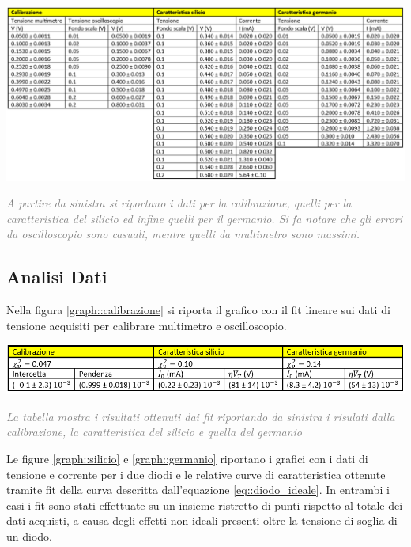 \documentclass[a4paper,11pt]{article}
\begin{document}
\begin{table}[h!]
    \centering
 \includegraphics[width=1. \textwidth]{pictures/tabella.png}
    
    \caption{\textit{\textcolor{gray}{A partire da sinistra si riportano i dati per la calibrazione, quelli per la caratteristica del silicio ed infine quelli per il germanio. Si fa notare che gli errori da oscilloscopio sono casuali, mentre quelli da multimetro sono massimi.}}}
        \label{tab::dati}
\end{table}


\subsection{Analisi Dati} 

Nella figura \ref{graph::calibrazione} si riporta il grafico con il fit lineare sui dati di tensione acquisiti per calibrare multimetro e oscilloscopio. 

\begin{table}[h!]
	\centering
  \includegraphics[width=1.\textwidth]{pictures/risultati2.png}	\caption{\textit{\textcolor{gray}{La tabella mostra i risultati ottenuti dai fit riportando da sinistra i risulati dalla calibrazione, la caratteristica del silicio e quella del germanio}}}
    \label{tab::risultati}
\end{table}

Le figure \ref{graph::silicio} e \ref{graph::germanio} riportano i grafici con i dati di tensione e corrente per i due diodi e le relative curve di caratteristica ottenute tramite fit della curva descritta dall'equazione \ref{eq::diodo_ideale}. In entrambi i casi i fit sono stati effettuate su un insieme ristretto di punti rispetto al totale dei dati acquisti, a causa degli effetti non ideali presenti oltre la tensione di soglia di un diodo.
\end{document}
